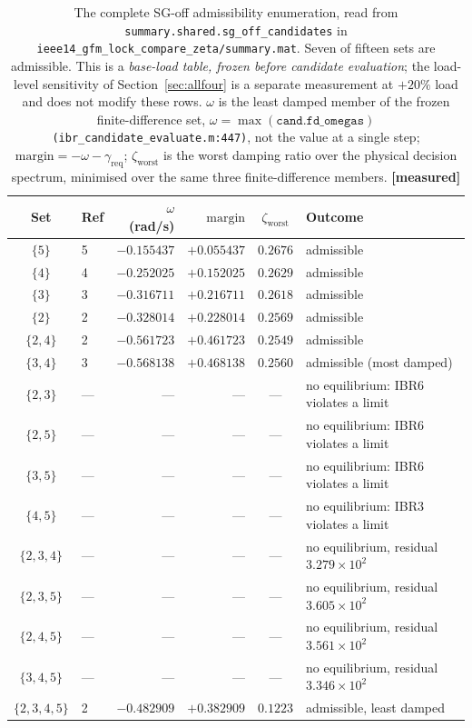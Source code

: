 \documentclass[12pt,a4paper]{article}
\theoremstyle{remark}
\newcommand{\zworst}{\zeta_{\mathrm{worst}}}
\newcommand{\greq}{\gamma_{\mathrm{req}}}
\newcommand{\code}[1]{\texttt{\small #1}}
\newcommand{\measured}{\textcolor{ok}{\textbf{[measured]}}}
\begin{document}
\begin{table}[H]
\centering
\small
\begin{tabular}{@{}clrrcl@{}}
\toprule
\textbf{Set} & \textbf{Ref} & $\omega$ (rad/s) & $\mathrm{margin}$ & $\zworst$ & \textbf{Outcome}\\
\midrule
$\{5\}$        & 5 & $-0.155437$ & $+0.055437$ & $0.2676$ & admissible\\
$\{4\}$        & 4 & $-0.252025$ & $+0.152025$ & $0.2629$ & admissible\\
$\{3\}$        & 3 & $-0.316711$ & $+0.216711$ & $0.2618$ & admissible\\
$\{2\}$        & 2 & $-0.328014$ & $+0.228014$ & $0.2569$ & admissible\\
$\{2,4\}$      & 2 & $-0.561723$ & $+0.461723$ & $0.2549$ & admissible\\
$\{3,4\}$      & 3 & $\mathbf{-0.568138}$ & $\mathbf{+0.468138}$ & $0.2560$ & admissible (most damped)\\
\midrule
$\{2,3\}$      & --- & --- & --- & --- & no equilibrium: IBR6 violates a limit\\
$\{2,5\}$      & --- & --- & --- & --- & no equilibrium: IBR6 violates a limit\\
$\{3,5\}$      & --- & --- & --- & --- & no equilibrium: IBR6 violates a limit\\
$\{4,5\}$      & --- & --- & --- & --- & no equilibrium: IBR3 violates a limit\\
\midrule
$\{2,3,4\}$    & --- & --- & --- & --- & no equilibrium, residual $3.279\times10^{2}$\\
$\{2,3,5\}$    & --- & --- & --- & --- & no equilibrium, residual $3.605\times10^{2}$\\
$\{2,4,5\}$    & --- & --- & --- & --- & no equilibrium, residual $3.561\times10^{2}$\\
$\{3,4,5\}$    & --- & --- & --- & --- & no equilibrium, residual $3.346\times10^{2}$\\
\midrule
$\{2,3,4,5\}$  & 2 & $-0.482909$ & $+0.382909$ & $\mathbf{0.1223}$ & admissible, least damped\\
\bottomrule
\end{tabular}
\caption{The complete SG-off admissibility enumeration, read from
\code{summary.shared.sg\_off\_candidates} in
\code{ieee14\_gfm\_lock\_compare\_zeta/summary.mat}. Seven of fifteen sets are
admissible. This is a \emph{base-load table, frozen before candidate evaluation};
the load-level sensitivity of Section~\ref{sec:allfour} is a separate measurement
at $+20\%$ load and does not modify these rows.
$\omega$ is the least damped member of the frozen finite-difference set,
$\omega = \max(\texttt{cand.fd\_omegas})$
\code{(ibr\_candidate\_evaluate.m:447)}, not the value at a single step;
$\mathrm{margin} = -\omega - \greq$; $\zworst$ is the worst damping ratio over the
physical decision spectrum, minimised over the same three finite-difference
members. \measured}
\label{tab:adm}
\end{table}
\end{document}
